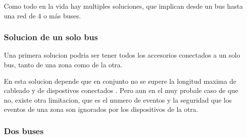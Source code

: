 Como todo en la vida hay multiples soluciones, que implican desde un bus hasta una red de 4 o más buses.

\subsubsection{Solucion de un solo bus}
Una primera solucion podria ser tener todos los accesorios conectados a un solo bus, tanto de una zona como de la otra.

En esta solucion depende que en conjunto no se supere la longitud maxima de cableado y de dispostivos conectados .
Pero aun en el muy probale caso de que no, existe otra limitacion, que es el numero de eventos y la seguridad que los eventos de una zona son ignorados por los dispositivos de la otra.

\subsubsection{Dos buses}
